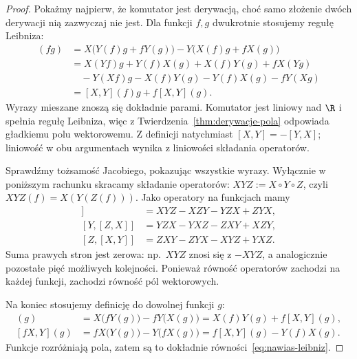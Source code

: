 \begin{proof}
Pokażmy najpierw, że komutator jest derywacją, choć samo
złożenie dwóch derywacji nią zazwyczaj nie jest.
Dla funkcji $f,g$ dwukrotnie stosujemy regułę Leibniza:
\begin{align*}
[X,Y](fg)
&=X\bigl(Y(f)g+fY(g)\bigr)
  -Y\bigl(X(f)g+fX(g)\bigr)\\
&=X(Yf)g+Y(f)X(g)+X(f)Y(g)+fX(Yg)\\
&\quad-Y(Xf)g-X(f)Y(g)-Y(f)X(g)-fY(Xg)\\
&=[X,Y](f)g+f[X,Y](g).
\end{align*}
Wyrazy mieszane znoszą się dokładnie parami. Komutator
jest liniowy nad $\R$ i spełnia regułę Leibniza,
więc z Twierdzenia~\ref{thm:derywacje-pola} odpowiada
gładkiemu polu wektorowemu. Z definicji natychmiast
$[X,Y]=-[Y,X]$; liniowość w obu argumentach wynika
z liniowości składania operatorów.

Sprawdźmy tożsamość Jacobiego, pokazując wszystkie
wyrazy. Wyłącznie w poniższym rachunku skracamy składanie
operatorów: $XYZ:=X\circ Y\circ Z$, czyli
$XYZ(f)=X(Y(Z(f)))$. Jako operatory na funkcjach mamy
\begin{align*}
[X,[Y,Z]]&=XYZ-XZY-YZX+ZYX,\\
[Y,[Z,X]]&=YZX-YXZ-ZXY+XZY,\\
[Z,[X,Y]]&=ZXY-ZYX-XYZ+YXZ.
\end{align*}
Suma prawych stron jest zerowa: np.\ $XYZ$ znosi się
z $-XYZ$, a analogicznie pozostałe pięć możliwych
kolejności. Ponieważ równość operatorów zachodzi na
każdej funkcji, zachodzi równość pól wektorowych.

Na koniec stosujemy definicję do dowolnej funkcji $g$:
\begin{align*}
[X,fY](g)
 &=X\bigl(fY(g)\bigr)-fY\bigl(X(g)\bigr)
  =X(f)Y(g)+f[X,Y](g),\\
[fX,Y](g)
 &=fX\bigl(Y(g)\bigr)-Y\bigl(fX(g)\bigr)
  =f[X,Y](g)-Y(f)X(g).
\end{align*}
Funkcje rozróżniają pola, zatem są to dokładnie
równości~\eqref{eq:nawias-leibniz}.
\end{proof}

